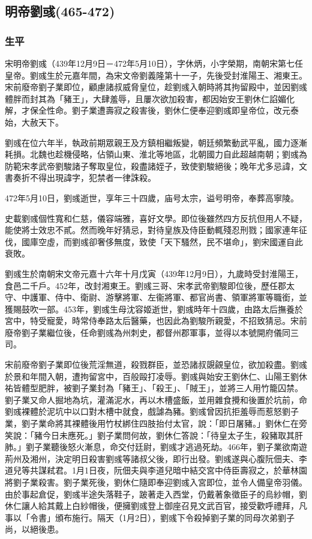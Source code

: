 
\subsection{明帝劉彧\tiny(465-472)}

\subsubsection{生平}

宋明帝劉彧（439年12月9日－472年5月10日），字休炳，小字榮期，南朝宋第七任皇帝。劉彧生於元嘉年間，為宋文帝劉義隆第十一子，先後受封淮陽王、湘東王。宋前廢帝劉子業即位，顧慮諸叔威脅皇位，趁劉彧入朝時將其拘留殿中，並因劉彧體胖而封其為「豬王」，大肆羞辱，且屢次欲加殺害，都因始安王劉休仁諂媚化解，才保全性命。劉子業遭壽寂之殺害後，劉休仁便奉迎劉彧即皇帝位，改元泰始，大赦天下。

劉彧在位六年半，執政前期眾親王及方鎮相繼叛變，朝廷頻繁動武平亂，國力逐漸耗損。北魏也趁機侵略，佔領山東、淮北等地區，北朝國力自此超越南朝；劉彧為防範宋孝武帝劉駿諸子奪取皇位，殺盡諸姪子，致使劉駿絕後；晚年尤多忌諱，文書奏折不得出現諱字，犯禁者一律誅殺。

472年5月10日，劉彧逝世，享年三十四歲，庙号太宗，谥号明帝，奉葬高寧陵。

史載劉彧個性寬和仁慈，儀容端雅，喜好文學。即位後雖然四方反抗但用人不疑，能使將士效忠不貳。然而晚年好猜忌，對待皇族及侍臣動輒殘忍刑戮；國家連年征伐，國庫空虛，而劉彧卻奢侈無度，致使「天下騷然，民不堪命」，劉宋國運自此衰敗。

劉彧生於南朝宋文帝元嘉十六年十月戊寅（439年12月9日），九歲時受封淮陽王，食邑二千戶。452年，改封湘東王。劉彧三哥、宋孝武帝劉駿即位後，歷任郡太守、中護軍、侍中、衛尉、游擊將軍、左衞將軍、都官尚書、領軍將軍等職銜，並獲賜鼓吹一部。453年，劉彧生母沈容姬逝世，劉彧時年十四歲，由路太后撫養於宮中，特受寵愛，時常侍奉路太后醫藥，也因此為劉駿所親愛，不招致猜忌。宋前廢帝劉子業繼位後，任命劉彧為州刺史，都督州郡軍事，並得以本號開府儀同三司。

宋前廢帝劉子業即位後荒淫無道，殺戮群臣，並恐諸叔覬覦皇位，欲加殺盡。劉彧於景和年間入朝，遭拘留宮中，百般毆打凌辱。劉彧與始安王劉休仁、山陽王劉休祐皆體型肥胖，被劉子業封為「豬王」、「殺王」、「賊王」，並將三人用竹籠囚禁。劉子業又命人掘地為坑，灌滿泥水，再以木槽盛飯，並用雜食攪和後置於坑前，命劉彧裸體於泥坑中以口對木槽中就食，戲謔為豬。劉彧曾因抗拒羞辱而惹怒劉子業，劉子業命將其裸體後用竹杖綁住四肢抬付太官，說：「即日屠豬。」劉休仁在旁笑說：「豬今日未應死。」劉子業問何故，劉休仁答說：「待皇太子生，殺豬取其肝肺。」劉子業聽後怒火漸息，命交付廷尉，劉彧才逃過死劫。466年，劉子業欲南遊荊州及湘州，決定明日殺害劉彧等諸叔父後，即行出發。劉彧遂與心腹阮佃夫、李道兒等共謀弒君。1月1日夜，阮佃夫與李道兒暗中結交宮中侍臣壽寂之，於華林園將劉子業殺害。劉子業死後，劉休仁隨即奉迎劉彧入宮即位，並令人備皇帝羽儀。由於事起倉促，劉彧半途失落鞋子，跛著走入西堂，仍戴著象徵臣子的烏紗帽，劉休仁讓人給其戴上白紗帽後，便擁劉彧登上御座召見文武百官，接受歡呼禮拜，凡事以「令書」頒布施行。隔天（1月2日），劉彧下令殺掉劉子業的同母次弟劉子尚，以絕後患。

